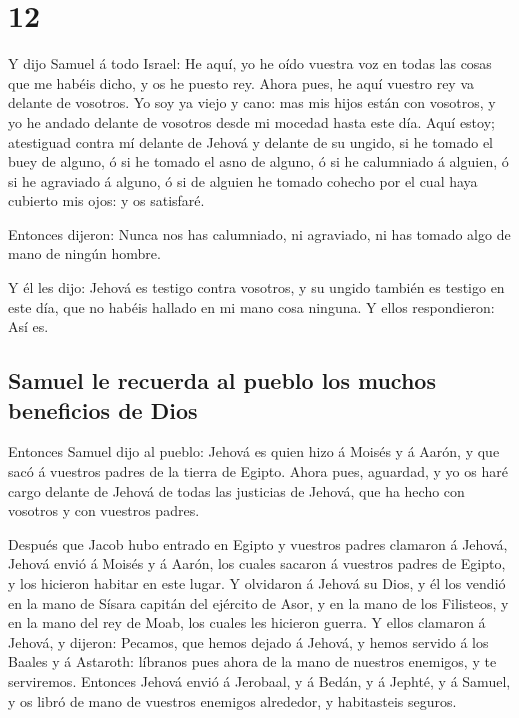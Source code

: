 \hypertarget{section-11}{%
\section{12}\label{section-11}}

 Y dijo Samuel á todo Israel: He aquí, yo he oído vuestra
voz en todas las cosas que me habéis dicho, y os he puesto rey.
 Ahora pues, he aquí vuestro rey va delante de vosotros.
Yo soy ya viejo y cano: mas mis hijos están con vosotros, y yo he andado
delante de vosotros desde mi mocedad hasta este día.  Aquí
estoy; atestiguad contra mí delante de Jehová y delante de su ungido, si
he tomado el buey de alguno, ó si he tomado el asno de alguno, ó si he
calumniado á alguien, ó si he agraviado á alguno, ó si de alguien he
tomado cohecho por el cual haya cubierto mis ojos: y os satisfaré.

 Entonces dijeron: Nunca nos has calumniado, ni agraviado,
ni has tomado algo de mano de ningún hombre.

 Y él les dijo: Jehová es testigo contra vosotros, y su
ungido también es testigo en este día, que no habéis hallado en mi mano
cosa ninguna. Y ellos respondieron: Así es.

\hypertarget{samuel-le-recuerda-al-pueblo-los-muchos-beneficios-de-dios}{%
\subsection{Samuel le recuerda al pueblo los muchos beneficios de
Dios}\label{samuel-le-recuerda-al-pueblo-los-muchos-beneficios-de-dios}}

 Entonces Samuel dijo al pueblo: Jehová es quien hizo á
Moisés y á Aarón, y que sacó á vuestros padres de la tierra de Egipto.
 Ahora pues, aguardad, y yo os haré cargo delante de
Jehová de todas las justicias de Jehová, que ha hecho con vosotros y con
vuestros padres.

 Después que Jacob hubo entrado en Egipto y vuestros
padres clamaron á Jehová, Jehová envió á Moisés y á Aarón, los cuales
sacaron á vuestros padres de Egipto, y los hicieron habitar en este
lugar.  Y olvidaron á Jehová su Dios, y él los vendió en
la mano de Sísara capitán del ejército de Asor, y en la mano de los
Filisteos, y en la mano del rey de Moab, los cuales les hicieron guerra.
 Y ellos clamaron á Jehová, y dijeron: Pecamos, que hemos
dejado á Jehová, y hemos servido á los Baales y á Astaroth: líbranos
pues ahora de la mano de nuestros enemigos, y te serviremos.
 Entonces Jehová envió á Jerobaal, y á Bedán, y á Jephté,
y á Samuel, y os libró de mano de vuestros enemigos alrededor, y
habitasteis seguros.


